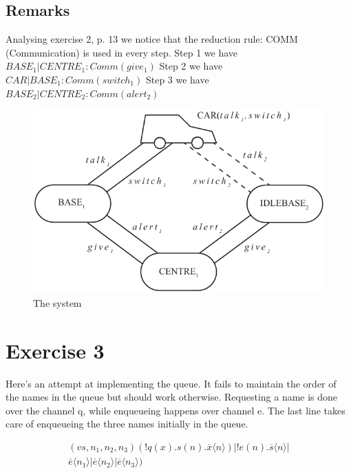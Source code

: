 \documentclass[11pt]{article}
\begin{document}
\subsection{Remarks}
Analysing exercise 2, p. 13 we notice that the reduction rule: COMM (Communication) is used in every step. \newline
Step 1 we have $BASE_1 | CENTRE_1 : Comm(give_1)$ \newline
Step 2 we have $CAR | BASE_1 : Comm(switch_1)$ \newline
Step 3 we have $BASE_2 | CENTRE_2 : Comm(alert_2)$ \newline

\begin{figure}
\begin{center}
\includegraphics{handin-1-car-base-center-switching.pdf}
\caption{The system}
\end{center}
\end{figure}


\section{Exercise 3}
Here's an attempt at implementing the queue. It fails to maintain the order of the names in the queue but should work otherwise. Requesting a name is done over the channel q, while enqueueing happens over channel e. The last line takes care of enqueueing the three names initially in the queue.

\begin{equation}
\begin{split}
(v s, n_1, n_2, n_3)(!q(x) . s(n) . \overline{x} \langle n \rangle ) | !e(n) . \overline{s} \langle n \rangle | \\
\overline{e} \langle n_1 \rangle | \overline{e} \langle n_2 \rangle | \overline{e} \langle n_3 \rangle)
\end{split}
\end{equation}

\nocite{*}


\end{document}
